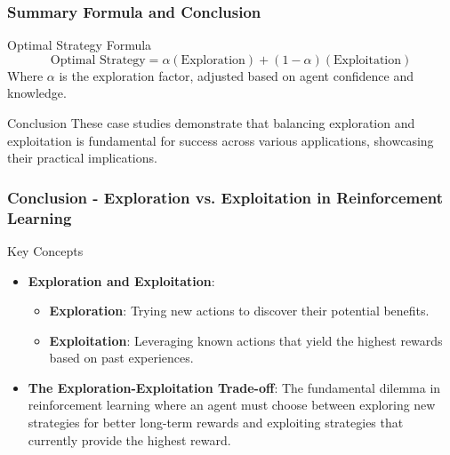 \documentclass[aspectratio=169]{beamer}
\begin{document}
\begin{frame}[fragile]
    \frametitle{Summary Formula and Conclusion}
    \begin{block}{Optimal Strategy Formula}
        \begin{equation}
            \text{Optimal Strategy} = \alpha(\text{Exploration}) + (1 - \alpha)(\text{Exploitation})
        \end{equation}
        Where $\alpha$ is the exploration factor, adjusted based on agent confidence and knowledge.
    \end{block}
    
    \begin{block}{Conclusion}
        These case studies demonstrate that balancing exploration and exploitation is fundamental for success across various applications, showcasing their practical implications.
    \end{block}
\end{frame}

\begin{frame}[fragile]
    \frametitle{Conclusion - Exploration vs. Exploitation in Reinforcement Learning}
    \begin{block}{Key Concepts}
        \begin{itemize}
            \item \textbf{Exploration and Exploitation}: 
                \begin{itemize}
                    \item \textbf{Exploration}: Trying new actions to discover their potential benefits.
                    \item \textbf{Exploitation}: Leveraging known actions that yield the highest rewards based on past experiences.
                \end{itemize}
            \item \textbf{The Exploration-Exploitation Trade-off}: 
                The fundamental dilemma in reinforcement learning where an agent must choose between exploring new strategies for better long-term rewards and exploiting strategies that currently provide the highest reward.
        \end{itemize}
    \end{block}
\end{frame}
\end{document}
